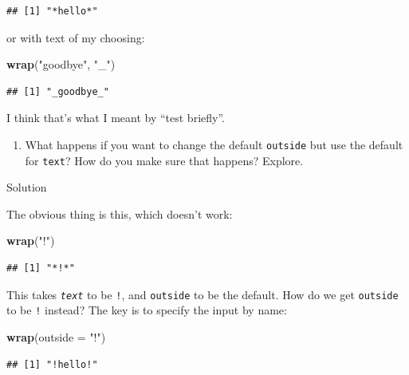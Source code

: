 \documentclass[]{tufte-book}
\newenvironment{Shaded}{}{}
\newcommand{\DataTypeTok}[1]{\textcolor[rgb]{0.56,0.13,0.00}{#1}}
\newcommand{\KeywordTok}[1]{\textcolor[rgb]{0.00,0.44,0.13}{\textbf{#1}}}
\newcommand{\NormalTok}[1]{#1}
\newcommand{\StringTok}[1]{\textcolor[rgb]{0.25,0.44,0.63}{#1}}
\providecommand{\tightlist}{%
  \setlength{\itemsep}{0pt}\setlength{\parskip}{0pt}}
\theoremstyle{definition}
\theoremstyle{definition}
\theoremstyle{definition}
\theoremstyle{remark}
\begin{document}
\begin{verbatim}
## [1] "*hello*"
\end{verbatim}

or with text of my choosing:

\begin{Shaded}
\begin{Highlighting}[]
\KeywordTok{wrap}\NormalTok{(}\StringTok{"goodbye"}\NormalTok{, }\StringTok{"_"}\NormalTok{)}
\end{Highlighting}
\end{Shaded}

\begin{verbatim}
## [1] "_goodbye_"
\end{verbatim}

I think that's what I meant by ``test briefly''.

\begin{enumerate}
\def\labelenumi{(\alph{enumi})}
\setcounter{enumi}{6}
\tightlist
\item
  What happens if you want to change the default \texttt{outside} but
  use the default for \texttt{text}? How do you make sure that happens?
  Explore.
\end{enumerate}

Solution

The obvious thing is this, which doesn't work:

\begin{Shaded}
\begin{Highlighting}[]
\KeywordTok{wrap}\NormalTok{(}\StringTok{"!"}\NormalTok{)}
\end{Highlighting}
\end{Shaded}

\begin{verbatim}
## [1] "*!*"
\end{verbatim}

This takes \emph{\texttt{text}} to be \texttt{!}, and \texttt{outside}
to be the default. How do we get \texttt{outside} to be \texttt{!}
instead? The key is to specify the input by name:

\begin{Shaded}
\begin{Highlighting}[]
\KeywordTok{wrap}\NormalTok{(}\DataTypeTok{outside =} \StringTok{"!"}\NormalTok{)}
\end{Highlighting}
\end{Shaded}

\begin{verbatim}
## [1] "!hello!"
\end{verbatim}
\end{document}
